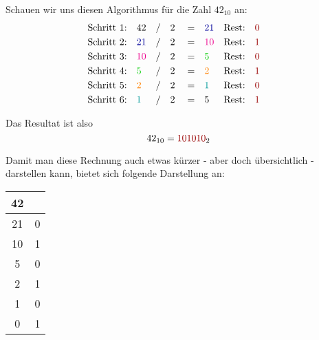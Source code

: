 Schauen wir uns diesen Algorithmus für die Zahl $42_{10}$ an:
\begin{align*}
	&\text{Schritt 1:}& &42                     & &/& &2& &=& &\textcolor{blue}{21}   & &\text{Rest:}& &\textcolor{red}{0}& \\
	&\text{Schritt 2:}& &\textcolor{blue}{21}   & &/& &2& &=& &\textcolor{magenta}{10}& &\text{Rest:}& &\textcolor{red}{1}& \\
	&\text{Schritt 3:}& &\textcolor{magenta}{10}& &/& &2& &=& &\textcolor{green}{5}   & &\text{Rest:}& &\textcolor{red}{0}& \\
	&\text{Schritt 4:}& &\textcolor{green}{5}   & &/& &2& &=& &\textcolor{orange}{2}  & &\text{Rest:}& &\textcolor{red}{1}& \\
	&\text{Schritt 5:}& &\textcolor{orange}{2}  & &/& &2& &=& &\textcolor{cyan}{1}    & &\text{Rest:}& &\textcolor{red}{0}& \\
	&\text{Schritt 6:}& &\textcolor{cyan}{1}    & &/& &2& &=& &\textcolor{black}{5}   & &\text{Rest:}& &\textcolor{red}{1}&   
\end{align*}

Das Resultat ist also
$$42_{10} = \textcolor{red}{101010}_2$$

Damit man diese Rechnung auch etwas kürzer - aber doch übersichtlich - darstellen kann, bietet sich folgende Darstellung an:
\begin{table}[H]
	\centering
	\renewcommand{\arraystretch}{1.5}
	\begin{tabular}{|c|c|}
	\hline
	\textbf{42} & \\ \hline
	21 & 0 \\ \hline
	10 & 1 \\ \hline
	 5 & 0 \\ \hline
	 2 & 1 \\ \hline
	 1 & 0 \\ \hline
	 0 & 1 \\ \hline
	\end{tabular}
\end{table}


\newpage 

